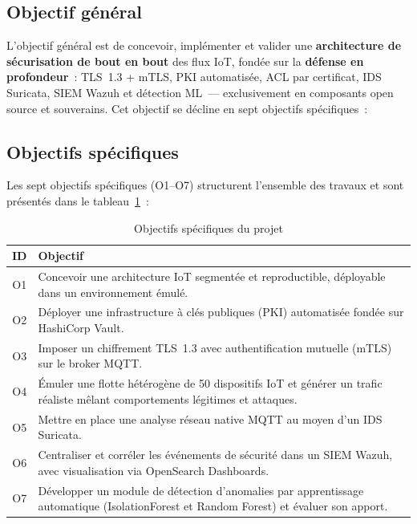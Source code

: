 \subsection{Objectif général}
\label{sec:objectif-general}

L'objectif général est de concevoir, implémenter et valider une \textbf{architecture de sécurisation de bout en bout} des flux IoT, fondée sur la \textbf{défense en profondeur}~: TLS~1.3 + mTLS, PKI automatisée, ACL par certificat, IDS Suricata, SIEM Wazuh et détection ML~--- exclusivement en composants open source et souverains. Cet objectif se décline en sept objectifs spécifiques~:

\subsection{Objectifs spécifiques}
\label{sec:objectifs}

Les sept objectifs spécifiques (O1--O7) structurent l'ensemble des travaux et sont présentés dans le tableau~\ref{tab:objectifs}~:

\begin{table}[!htbp]
\centering
\caption{Objectifs spécifiques du projet}
\label{tab:objectifs}
\begin{tabularx}{\linewidth}{|c|>{\raggedright\arraybackslash}X|}
\hline
\textbf{ID} & \textbf{Objectif} \\
\hline
O1 & Concevoir une architecture IoT segmentée et reproductible, déployable dans un environnement émulé. \\ \hline
O2 & Déployer une infrastructure à clés publiques (PKI) automatisée fondée sur HashiCorp Vault. \\ \hline
O3 & Imposer un chiffrement TLS~1.3 avec authentification mutuelle (mTLS) sur le broker MQTT. \\ \hline
O4 & Émuler une flotte hétérogène de 50 dispositifs IoT et générer un trafic réaliste mêlant comportements légitimes et attaques. \\ \hline
O5 & Mettre en place une analyse réseau native MQTT au moyen d'un IDS Suricata. \\ \hline
O6 & Centraliser et corréler les événements de sécurité dans un SIEM Wazuh, avec visualisation via OpenSearch Dashboards. \\ \hline
O7 & Développer un module de détection d'anomalies par apprentissage automatique (IsolationForest et Random Forest) et évaluer son apport. \\ \hline
\end{tabularx}
\end{table}

